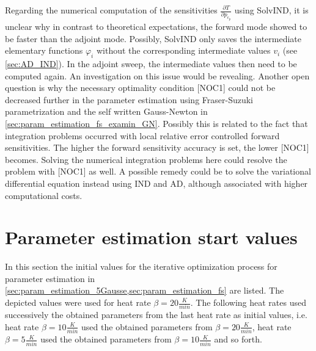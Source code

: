 \documentclass{scrartcl}[12pt, halfparskip]
\numberwithin{equation}{section}
\numberwithin{figure}{section}
\numberwithin{table}{section}
\begin{document}
Regarding the numerical computation of the sensitivities $\frac{\partial T}{\partial p_{c_p}}$ using SolvIND, it is unclear why in contrast to theoretical expectations, the forward mode showed to be faster than the adjoint mode.
Possibly, SolvIND only saves the intermediate elementary functions $\varphi_i$ without the corresponding intermediate values $v_i$ (see \cref{sec:AD_IND}). 
In the adjoint sweep, the intermediate values then need to be computed again. 
An investigation on this issue would be revealing. 
Another open question is why the necessary optimality condition [NOC1] could not be decreased further in the parameter estimation using Fraser-Suzuki parametrization and the self written Gauss-Newton in \cref{sec:param_estimation_fs_examin_GN}. 
Possibly this is related to the fact that integration problems occurred with local relative error controlled forward sensitivities. 
The higher the forward sensitivity accuracy is set, the lower [NOC1] becomes. 
Solving the numerical integration problems here could resolve the problem with [NOC1] as well. 
A possible remedy could be to solve the variational differential equation instead using IND and AD, although associated with higher computational costs. \\








\newpage
\appendix
\section{Parameter estimation start values}
In this section the initial values for the iterative optimization process for parameter estimation in \cref{sec:param_estimation_5Gausse,sec:param_estimation_fs} are listed. The depicted values were used for heat rate $\beta = 20 \frac{K}{min}$. The following heat rates used successively the obtained parameters from the last heat rate as initial values, i.e. heat rate $\beta = 10 \frac{K}{min}$ used the obtained parameters from $\beta = 20 \frac{K}{min}$, heat rate $\beta = 5 \frac{K}{min}$ used the obtained parameters from $\beta = 10 \frac{K}{min}$ and so forth.
\end{document}
